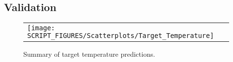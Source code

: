 \clearpage


\subsection*{Validation}

\begin{figure}[!ht]
\begin{center}
\begin{tabular}{l}
\texttt{[image: SCRIPT\_FIGURES/Scatterplots/Target\_Temperature]}
\end{tabular}
\end{center}
\caption[Summary of target temperature predictions]
{Summary of target temperature predictions.}
\label{Surface_Temperature_Steel_Summary}
\end{figure}

